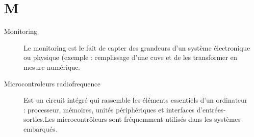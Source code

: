 \section{M}

\begin{description}

\item[Monitoring] Le monitoring est le fait de capter des grandeurs d'un système
électronique ou physique (exemple : remplissage d'une cuve et de les transformer
 en mesure numérique.

\item[Microcontroleurs radiofrequence]
 Est un circuit intégré qui rassemble les éléments essentiels d'un ordinateur : processeur, mémoires, unités périphériques et interfaces d'entrées-sorties.Les microcontrôleurs sont fréquemment utilisés dans les systèmes embarqués.


\end{description}



